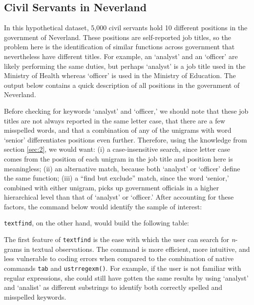 \subsection{Civil Servants in Neverland} \label{subsec:4.1}
In this hypothetical dataset, 5,000 civil servants hold 10 different positions in the government of Neverland. These positions are self-reported job titles, so the problem here is the identification of similar functions across government that nevertheless have different titles. For example, an `analyst' and an `officer' are likely performing the same duties, but perhaps `analyst' is a job title used in the Ministry of Health whereas `officer' is used in the Ministry of Education. The output below contains a quick description of all positions in the government of Neverland.

\begin{stlog}
\nullskip
\end{stlog}

Before checking for keywords `analyst' and `officer,' we should note that these job titles are not always reported in the same letter case, that there are a few misspelled words, and that a combination of any of the unigrams with word `senior' differentiates positions even further. Therefore, using the knowledge from section \ref{sec:2}, we would want: (i) a case-insensitive search, since letter case comes from the position of each unigram in the job title and position here is meaningless; (ii) an alternative match, because both `analyst' or `officer' define the same function; (iii) a ``find but exclude'' match, since the word `senior,' combined with either unigram, picks up government officials in a higher hierarchical level than that of `analyst' or `officer.' After accounting for these factors, the command below would identify the sample of interest:

\begin{stlog}
\nullskip
\end{stlog}

{\tt textfind}, on the other hand, would build the following table:

\begin{stlog}
\nullskip
\end{stlog}

The first feature of {\tt textfind} is the ease with which the user can search for {\it n}-grams in textual observations. The command is more efficient, more intuitive, and less vulnerable to coding errors when compared to the combination of native commands {\tt tab} and {\tt ustrregexm()}. For example, if the user is not familiar with regular expressions, she could still have gotten the same results by using `analyst' and `analist' as different substrings to identify both correctly spelled and misspelled keywords.

